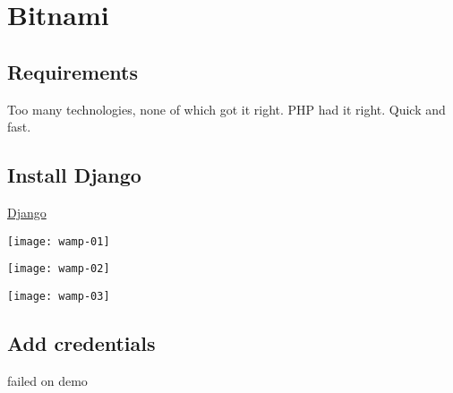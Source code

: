 \chapter{Bitnami}

\section{Requirements}

Too many technologies, none of which got it right. PHP had it right. Quick and fast.  

\section{Install Django}

\href{https://bitnami.com/download/files/stacks/djangostack/1.7.10-0/bitnami-djangostack-1.7.10-0-windows-installer.exe}{Django}

\texttt{[image: wamp-01]}

\texttt{[image: wamp-02]}

\texttt{[image: wamp-03]}



\section{Add credentials}

failed on demo


